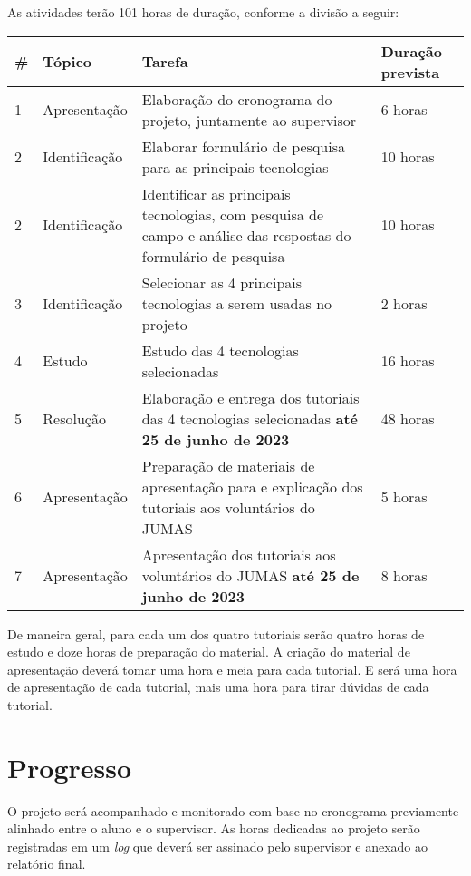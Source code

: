 \documentclass{article}
\begin{document}
As atividades terão 101 horas de duração, conforme a divisão a seguir:

\begin{center}
  \begin{tabular}{ | l | l | p{5cm} | l | }
    \hline
    \# & Tópico & Tarefa & Duração prevista \\ \hline
    1 & Apresentação & Elaboração do cronograma do projeto, juntamente ao supervisor & 6 horas \\ \hline
    2 & Identificação & Elaborar formulário de pesquisa para as principais tecnologias & 10 horas \\ \hline
    2 & Identificação & Identificar as principais tecnologias, com pesquisa de campo e análise das respostas do formulário de pesquisa & 10 horas \\ \hline
    3 & Identificação & Selecionar as 4 principais tecnologias a serem usadas no projeto & 2 horas \\ \hline
    4 & Estudo & Estudo das 4 tecnologias selecionadas  & 16 horas \\ \hline
    5 & Resolução & Elaboração e entrega dos tutoriais das 4 tecnologias selecionadas \textbf{até 25 de junho de 2023} & 48 horas  \\ \hline
    6 & Apresentação & Preparação de materiais de apresentação para e explicação dos tutoriais aos voluntários do JUMAS & 5 horas  \\ \hline
    7 & Apresentação & Apresentação dos tutoriais aos voluntários do JUMAS \textbf{até 25 de junho de 2023} & 8 horas  \\ \hline
 \end{tabular}
\end{center}

De maneira geral, para cada um dos quatro tutoriais serão quatro horas de estudo e doze horas de preparação do material. A criação do material de apresentação deverá tomar uma hora e meia para cada tutorial. E será uma hora de apresentação de cada tutorial, mais uma hora para tirar dúvidas de cada tutorial.


\section{Progresso}

O projeto será acompanhado e monitorado com base no cronograma previamente alinhado entre o aluno e o supervisor. As horas dedicadas ao projeto serão registradas em um \textit{log} que deverá ser assinado pelo supervisor e anexado ao relatório final.
\end{document}
